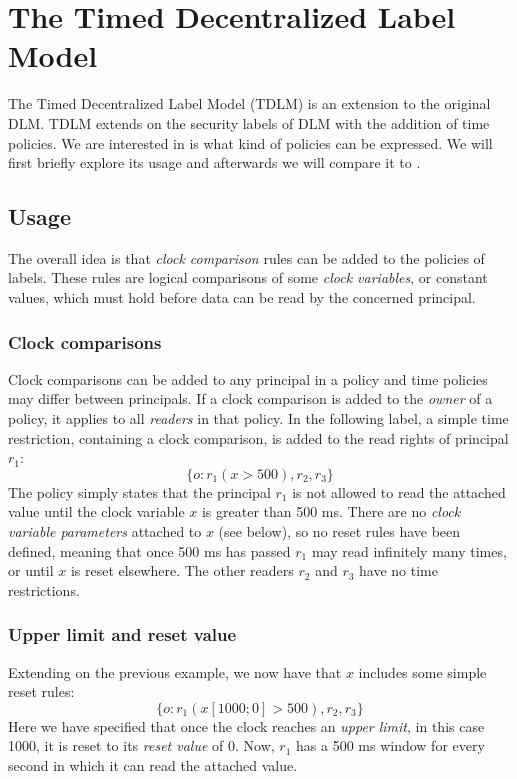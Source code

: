 
\newcommand{\tat}{\;@\;} %
\newcommand{\tdor}{\;||\;} %
\newcommand{\tdand}{\;\&\&\;} %

\section{The Timed Decentralized Label Model}
The Timed Decentralized Label Model (TDLM) \cite{pedersen2015} is an extension to the original DLM.
TDLM extends on the security labels of DLM with the addition of time policies.
We are interested in is what kind of policies can be expressed.
We will first briefly explore its usage and afterwards we will compare it to \thelang.

\subsection{Usage}
The overall idea is that \emph{clock comparison} rules can be added to the policies of labels.
These rules are logical comparisons of some \emph{clock variables}, or constant values, which must hold before data can be read by the concerned principal.

\subsubsection{Clock comparisons}
Clock comparisons can be added to any principal in a policy and time policies may differ between principals.
If a clock comparison is added to the \emph{owner} of a policy, it applies to all \emph{readers} in that policy.
In the following label, a simple time restriction, containing a clock comparison, is added to the read rights of principal $r_1$:
  \[ \{ o : r_1(x > 500), r_2, r_3 \} \]
The policy simply states that the principal $r_1$ is not allowed to read the attached value until the clock variable $x$ is greater than 500 ms.
There are no \emph{clock variable parameters} attached to $x$ (see below), so no reset rules have been defined, meaning that once 500 ms has passed $r_1$ may read infinitely many times, or until $x$ is reset elsewhere.
The other readers $r_2$ and $r_3$ have no time restrictions.

\subsubsection{Upper limit and reset value}
Extending on the previous example, we now have that $x$ includes some simple reset rules:
  \[ \{ o : r_1(x[1000;0] > 500), r_2, r_3 \} \]
Here we have specified that once the clock reaches an \emph{upper limit}, in this case 1000, it is reset to its \emph{reset value} of 0.
Now, $r_1$ has a 500 ms window for every second in which it can read the attached value.

